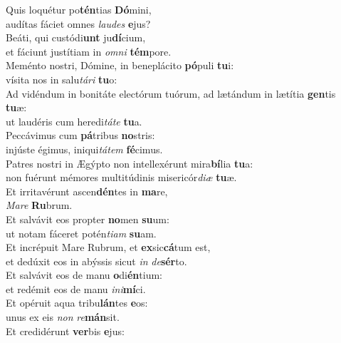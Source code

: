 \evenverse Quis loquétur po\textbf{tén}tias \textbf{Dó}mini,~\*\\
\evenverse audítas fáciet omnes \textit{lau}\textit{des} \textbf{e}jus?\\
\oddverse Beáti, qui custódi\textbf{unt} ju\textbf{dí}cium,~\*\\
\oddverse et fáciunt justítiam in \textit{om}\textit{ni} \textbf{tém}pore.\\
\evenverse Meménto nostri, Dómine, in beneplácito \textbf{pó}puli \textbf{tu}i:~\*\\
\evenverse vísita nos in salu\textit{tá}\textit{ri} \textbf{tu}o:\\
\oddverse Ad vidéndum in bonitáte electórum tuórum, ad lætándum in lætítia \textbf{gen}tis \textbf{tu}æ:~\*\\
\oddverse ut laudéris cum heredi\textit{tá}\textit{te} \textbf{tu}a.\\
\evenverse Peccávimus cum \textbf{pá}tribus \textbf{no}stris:~\*\\
\evenverse injúste égimus, iniqui\textit{tá}\textit{tem} \textbf{fé}cimus.\\
\oddverse Patres nostri in Ægýpto non intellexérunt mira\textbf{bí}lia \textbf{tu}a:~\*\\
\oddverse non fuérunt mémores multitúdinis misericór\textit{di}\textit{æ} \textbf{tu}æ.\\
\evenverse Et irritavérunt ascen\textbf{dén}tes in \textbf{ma}re,~\*\\
\evenverse \textit{Ma}\textit{re} \textbf{Ru}brum.\\
\oddverse Et salvávit eos propter \textbf{no}men \textbf{su}um:~\*\\
\oddverse ut notam fáceret potén\textit{ti}\textit{am} \textbf{su}am.\\
\evenverse Et incrépuit Mare Rubrum, et \textbf{ex}sic\textbf{cá}tum est,~\*\\
\evenverse et dedúxit eos in abýssis sicut \textit{in} \textit{de}\textbf{sér}to.\\
\oddverse Et salvávit eos de manu \textbf{o}di\textbf{én}tium:~\*\\
\oddverse et redémit eos de manu \textit{i}\textit{ni}\textbf{mí}ci.\\
\evenverse Et opéruit aqua tribu\textbf{lán}tes \textbf{e}os:~\*\\
\evenverse unus ex eis \textit{non} \textit{re}\textbf{mán}sit.\\
\oddverse Et credidérunt \textbf{ver}bis \textbf{e}jus:~\*\\
